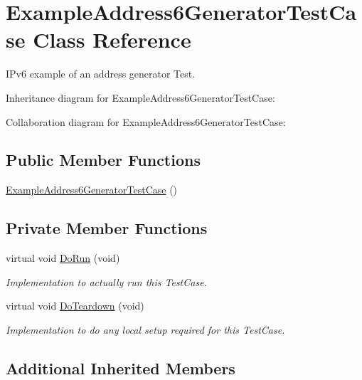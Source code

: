 \hypertarget{classExampleAddress6GeneratorTestCase}{}\section{Example\+Address6\+Generator\+Test\+Case Class Reference}
\label{classExampleAddress6GeneratorTestCase}


I\+Pv6 example of an address generator Test.  




Inheritance diagram for Example\+Address6\+Generator\+Test\+Case\+:


Collaboration diagram for Example\+Address6\+Generator\+Test\+Case\+:
\subsection*{Public Member Functions}
\begin{DoxyCompactItemize}
\item 
\hyperlink{classExampleAddress6GeneratorTestCase_a56cd5d87892aa289e346c1153e719c35}{Example\+Address6\+Generator\+Test\+Case} ()
\end{DoxyCompactItemize}
\subsection*{Private Member Functions}
\begin{DoxyCompactItemize}
\item 
virtual void \hyperlink{classExampleAddress6GeneratorTestCase_a31c31d6ae068aa00c5d8cfc421181309}{Do\+Run} (void)
\begin{DoxyCompactList}\small\item\em Implementation to actually run this Test\+Case. \end{DoxyCompactList}\item 
virtual void \hyperlink{classExampleAddress6GeneratorTestCase_ad4365c4cc962ca136304cc912bce31a6}{Do\+Teardown} (void)
\begin{DoxyCompactList}\small\item\em Implementation to do any local setup required for this Test\+Case. \end{DoxyCompactList}\end{DoxyCompactItemize}
\subsection*{Additional Inherited Members}


